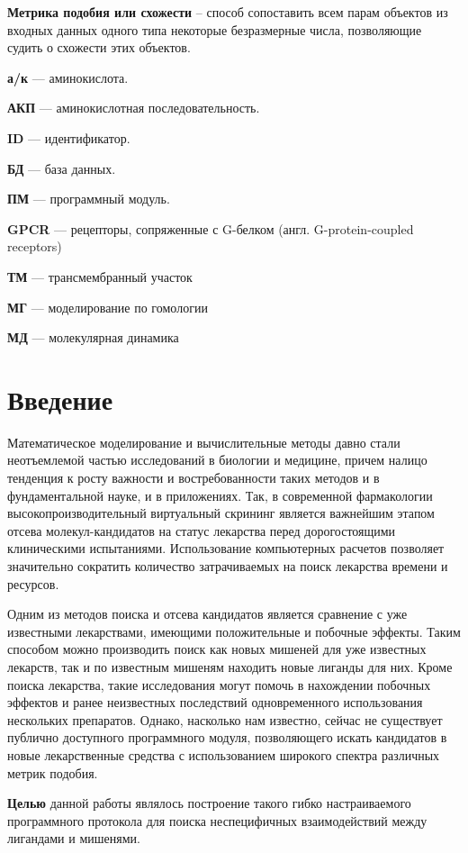 \documentclass[a4paper,14pt]{article}         %
\begin{document}
\textbf{Метрика подобия или схожести} -- способ сопоставить всем парам объектов из входных данных одного типа некоторые безразмерные числа, позволяющие судить о схожести этих объектов.

\textbf{а/к} --- аминокислота.

\textbf{АКП} --- аминокислотная последовательность.

\textbf{ID} --- идентификатор.

\textbf{БД} --- база данных.

\textbf{ПМ} --- программный модуль.



\color{gray}
\textbf{GPCR} --- рецепторы, сопряженные с G-белком (англ. G-protein-coupled receptors)

\textbf{ТМ} --- трансмембранный участок

\textbf{МГ} --- моделирование по гомологии

\textbf{МД} --- молекулярная динамика
\color{black}

\newpage
\section{Введение}
Математическое моделирование и вычислительные методы давно стали неотъемлемой частью исследований в биологии и медицине, причем налицо тенденция к росту важности и востребованности таких методов и в фундаментальной науке, и в приложениях. Так, в современной фармакологии высокопроизводительный виртуальный скрининг является важнейшим этапом отсева молекул-кандидатов на статус лекарства перед дорогостоящими клиническими испытаниями. Использование компьютерных расчетов позволяет значительно сократить количество затрачиваемых на поиск лекарства времени и ресурсов.

Одним из методов поиска и отсева кандидатов является сравнение с уже известными лекарствами, имеющими положительные и побочные эффекты. Таким способом можно производить поиск как новых мишеней для уже известных лекарств, так и по известным мишеням находить новые лиганды для них. Кроме поиска лекарства, такие исследования могут помочь в нахождении побочных эффектов и ранее неизвестных последствий одновременного использования нескольких препаратов. Однако, насколько нам известно, сейчас не существует публично доступного программного модуля, позволяющего искать кандидатов в новые лекарственные средства с использованием широкого спектра различных метрик подобия.

\textbf{Целью} данной работы являлось построение такого гибко настраиваемого программного протокола для поиска неспецифичных взаимодействий между лигандами и мишенями. 
\end{document}
